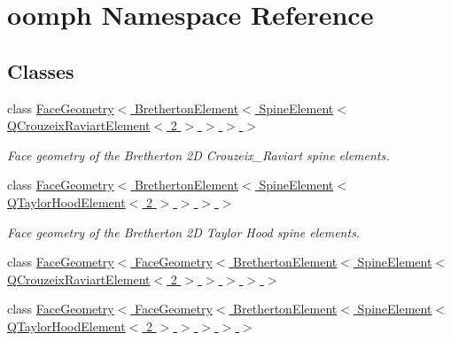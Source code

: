 \hypertarget{namespaceoomph}{}\section{oomph Namespace Reference}
\label{namespaceoomph}
\subsection*{Classes}
\begin{DoxyCompactItemize}
\item 
class \hyperlink{classoomph_1_1FaceGeometry_3_01BrethertonElement_3_01SpineElement_3_01QCrouzeixRaviartElement_3_012_01_4_01_4_01_4_01_4}{Face\+Geometry$<$ Bretherton\+Element$<$ Spine\+Element$<$ Q\+Crouzeix\+Raviart\+Element$<$ 2 $>$ $>$ $>$ $>$}
\begin{DoxyCompactList}\small\item\em Face geometry of the Bretherton 2D Crouzeix\+\_\+\+Raviart spine elements. \end{DoxyCompactList}\item 
class \hyperlink{classoomph_1_1FaceGeometry_3_01BrethertonElement_3_01SpineElement_3_01QTaylorHoodElement_3_012_01_4_01_4_01_4_01_4}{Face\+Geometry$<$ Bretherton\+Element$<$ Spine\+Element$<$ Q\+Taylor\+Hood\+Element$<$ 2 $>$ $>$ $>$ $>$}
\begin{DoxyCompactList}\small\item\em Face geometry of the Bretherton 2D Taylor Hood spine elements. \end{DoxyCompactList}\item 
class \hyperlink{classoomph_1_1FaceGeometry_3_01FaceGeometry_3_01BrethertonElement_3_01SpineElement_3_01QCrouzeix098df2efac952001ec21ccc10b121ae7}{Face\+Geometry$<$ Face\+Geometry$<$ Bretherton\+Element$<$ Spine\+Element$<$ Q\+Crouzeix\+Raviart\+Element$<$ 2 $>$ $>$ $>$ $>$ $>$}
\item 
class \hyperlink{classoomph_1_1FaceGeometry_3_01FaceGeometry_3_01BrethertonElement_3_01SpineElement_3_01QTaylorHoa5ee68c3d3e62f3e07a972f1f9faface}{Face\+Geometry$<$ Face\+Geometry$<$ Bretherton\+Element$<$ Spine\+Element$<$ Q\+Taylor\+Hood\+Element$<$ 2 $>$ $>$ $>$ $>$ $>$}
\end{DoxyCompactItemize}
